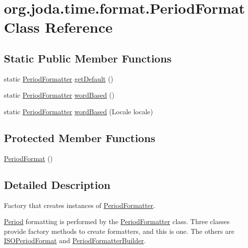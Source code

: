 \hypertarget{classorg_1_1joda_1_1time_1_1format_1_1_period_format}{\section{org.\-joda.\-time.\-format.\-Period\-Format Class Reference}
\label{classorg_1_1joda_1_1time_1_1format_1_1_period_format}
}
\subsection*{Static Public Member Functions}
\begin{DoxyCompactItemize}
\item 
static \hyperlink{classorg_1_1joda_1_1time_1_1format_1_1_period_formatter}{Period\-Formatter} \hyperlink{classorg_1_1joda_1_1time_1_1format_1_1_period_format_a16d11043524ca940c5afd7ad247f2f4f}{get\-Default} ()
\item 
static \hyperlink{classorg_1_1joda_1_1time_1_1format_1_1_period_formatter}{Period\-Formatter} \hyperlink{classorg_1_1joda_1_1time_1_1format_1_1_period_format_a7d9b3f3a779510e0a68ddc641bd71c0a}{word\-Based} ()
\item 
static \hyperlink{classorg_1_1joda_1_1time_1_1format_1_1_period_formatter}{Period\-Formatter} \hyperlink{classorg_1_1joda_1_1time_1_1format_1_1_period_format_ac97c0c77a464d51cd64adb720b57d994}{word\-Based} (Locale locale)
\end{DoxyCompactItemize}
\subsection*{Protected Member Functions}
\begin{DoxyCompactItemize}
\item 
\hyperlink{classorg_1_1joda_1_1time_1_1format_1_1_period_format_a7c237eda5b90a4171abe85810d4b6591}{Period\-Format} ()
\end{DoxyCompactItemize}


\subsection{Detailed Description}
Factory that creates instances of \hyperlink{classorg_1_1joda_1_1time_1_1format_1_1_period_formatter}{Period\-Formatter}. 

\hyperlink{classorg_1_1joda_1_1time_1_1_period}{Period} formatting is performed by the \hyperlink{classorg_1_1joda_1_1time_1_1format_1_1_period_formatter}{Period\-Formatter} class. Three classes provide factory methods to create formatters, and this is one. The others are \hyperlink{classorg_1_1joda_1_1time_1_1format_1_1_i_s_o_period_format}{I\-S\-O\-Period\-Format} and \hyperlink{classorg_1_1joda_1_1time_1_1format_1_1_period_formatter_builder}{Period\-Formatter\-Builder}. 

